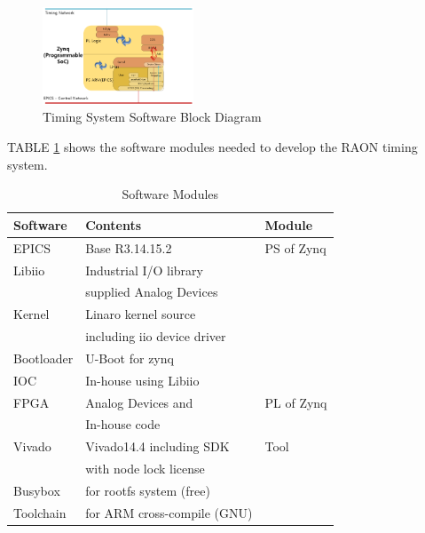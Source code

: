 \documentclass[journal,reqno]{IEEEtran}
\begin{document}
\begin{figure}[!htb]
	\centering
	\includegraphics*[width=0.4\textwidth, height=0.25\textwidth]{img24.png}
	\caption{Timing System Software Block Diagram}
	\label{timing_sw_block}
\end{figure}

TABLE \ref{sw-conf} shows the software modules needed to develop the RAON timing system.

\begin{table}[h!t]
	\centering
	\caption{Software Modules}
	\label{sw-conf}
	\begin{tabular}{@{}lll@{}}
		\hline
		\textbf{Software} & \textbf{Contents}                 & \textbf{Module}     \\
		\hline
		EPICS        & Base R3.14.15.2                       & PS of Zynq            \\
		Libiio       & Industrial I/O library                &                       \\
		& supplied Analog Devices               &                       \\         
		Kernel       & Linaro kernel source                  &                       \\
		& including iio device driver           &                       \\         
		Bootloader   & U-Boot for zynq                       &                       \\
		IOC          & In-house using Libiio                 &                       \\
		
		\hline
		FPGA         & Analog Devices and                    & PL of Zynq            \\
		& In-house code                         &                       \\
		
		\hline
		Vivado       & Vivado14.4 including SDK              & Tool                  \\        
		& with node lock license                &                       \\            
		Busybox      & for rootfs system (free)              &                       \\
		Toolchain    & for ARM cross-compile (GNU)           &                       \\        
		\hline
	\end{tabular}
\end{table}
\end{document}
